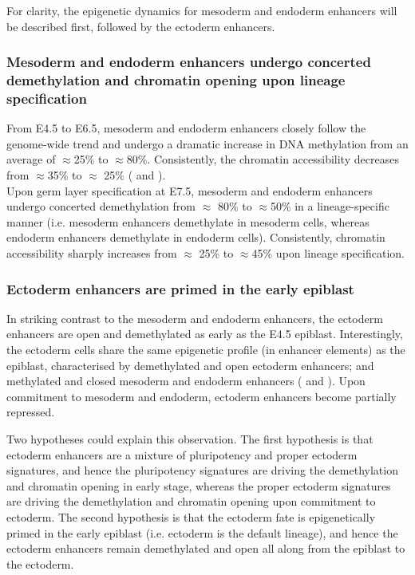 For clarity, the epigenetic dynamics for mesoderm and endoderm enhancers will be described first, followed by the ectoderm enhancers.

\subsubsection{Mesoderm and endoderm enhancers undergo concerted demethylation and chromatin opening upon lineage specification}

From E4.5 to E6.5, mesoderm and endoderm enhancers closely follow the genome-wide trend and undergo a dramatic increase in DNA methylation from an average of $\approx$25\% to $\approx$80\%. Consistently, the chromatin accessibility decreases from $\approx$35\% to $\approx$ 25\% ( and ).\\
Upon germ layer specification at E7.5, mesoderm and endoderm enhancers undergo concerted demethylation from $\approx$ 80\% to $\approx$50\% in a lineage-specific manner (i.e. mesoderm enhancers demethylate in mesoderm cells, whereas endoderm enhancers demethylate in endoderm cells). Consistently, chromatin accessibility sharply increases from $\approx$ 25\% to $\approx$45\% upon lineage specification.



\subsubsection{Ectoderm enhancers are primed in the early epiblast}

In striking contrast to the mesoderm and endoderm enhancers, the ectoderm enhancers are open and demethylated as early as the E4.5 epiblast. Interestingly, the ectoderm cells share the same epigenetic profile (in enhancer elements) as the epiblast, characterised by demethylated and open ectoderm enhancers; and methylated and closed mesoderm and endoderm enhancers ( and ). Upon commitment to mesoderm and endoderm, ectoderm enhancers become partially repressed.

Two hypotheses could explain this observation. The first hypothesis is that ectoderm enhancers are a mixture of pluripotency and proper ectoderm signatures, and hence the pluripotency signatures are driving the demethylation and chromatin opening in early stage, whereas the proper ectoderm signatures are driving the demethylation and chromatin opening upon commitment to ectoderm. The second hypothesis is that the ectoderm fate is epigenetically primed in the early epiblast (i.e. ectoderm is the default lineage), and hence the ectoderm enhancers remain demethylated and open all along from the epiblast to the ectoderm.

